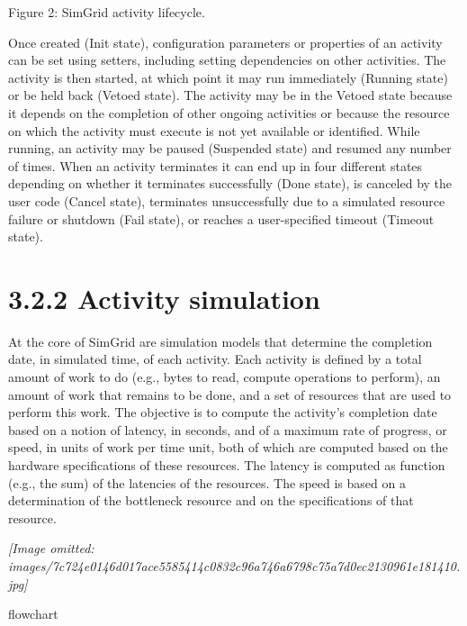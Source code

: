 \documentclass[
]{article}
\begin{document}
Figure 2: SimGrid activity lifecycle.

Once created (Init state), configuration parameters or properties of an
activity can be set using setters, including setting dependencies on
other activities. The activity is then started, at which point it may
run immediately (Running state) or be held back (Vetoed state). The
activity may be in the Vetoed state because it depends on the completion
of other ongoing activities or because the resource on which the
activity must execute is not yet available or identified. While running,
an activity may be paused (Suspended state) and resumed any number of
times. When an activity terminates it can end up in four different
states depending on whether it terminates successfully (Done state), is
canceled by the user code (Cancel state), terminates unsuccessfully due
to a simulated resource failure or shutdown (Fail state), or reaches a
user-specified timeout (Timeout state).

\section{3.2.2 Activity simulation}\label{activity-simulation}

At the core of SimGrid are simulation models that determine the
completion date, in simulated time, of each activity. Each activity is
defined by a total amount of work to do (e.g., bytes to read, compute
operations to perform), an amount of work that remains to be done, and a
set of resources that are used to perform this work. The objective is to
compute the activity's completion date based on a notion of latency, in
seconds, and of a maximum rate of progress, or speed, in units of work
per time unit, both of which are computed based on the hardware
specifications of these resources. The latency is computed as function
(e.g., the sum) of the latencies of the resources. The speed is based on
a determination of the bottleneck resource and on the specifications of
that resource.

\textit{[Image omitted: images/7c724e0146d017ace5585414c0832c96a746a6798c75a7d0ec2130961e181410.jpg]}

flowchart
\end{document}
